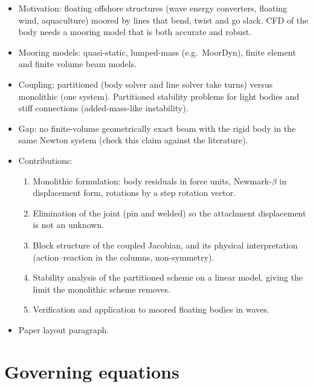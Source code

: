 \documentclass[11pt,a4paper]{article}
\begin{document}
\begin{itemize}
  \item Motivation: floating offshore structures (wave energy converters,
        floating wind, aquaculture) moored by lines that bend, twist and go
        slack. CFD of the body needs a mooring model that is both accurate
        and robust.
  \item Mooring models: quasi-static, lumped-mass (e.g.\ MoorDyn), finite
        element and finite volume beam models.
  \item Coupling: partitioned (body solver and line solver take turns) versus
        monolithic (one system). Partitioned stability problems for light
        bodies and stiff connections (added-mass-like instability).
  \item Gap: no finite-volume geometrically exact beam with the rigid body in
        the same Newton system (check this claim against the literature).
  \item Contributions:
  \begin{enumerate}
    \item Monolithic formulation: body residuals in force units,
          Newmark-$\beta$ in displacement form, rotations by a step rotation
          vector.
    \item Elimination of the joint (pin and welded) so the attachment
          displacement is not an unknown.
    \item Block structure of the coupled Jacobian, and its physical
          interpretation (action--reaction in the columns, non-symmetry).
    \item Stability analysis of the partitioned scheme on a linear model,
          giving the limit the monolithic scheme removes.
    \item Verification and application to moored floating bodies in waves.
  \end{enumerate}
  \item Paper layout paragraph.
\end{itemize}

\section{Governing equations}
\end{document}
